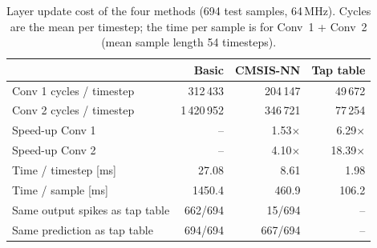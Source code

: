 \begin{table}[htbp]
\centering
\caption{Layer update cost of the four methods (694 test samples, 64\,MHz). Cycles are
the mean per timestep; the time per sample is for Conv~1 + Conv~2 (mean sample length 54 timesteps).}
\label{tab:method_comparison}
\begin{tabular}{lrrr}
\toprule
 & Basic & CMSIS-NN & Tap table \\
\midrule
Conv 1 cycles / timestep & 312\,433 & 204\,147 & 49\,672 \\
Conv 2 cycles / timestep & 1\,420\,952 & 346\,721 & 77\,254 \\
Speed-up Conv 1 & -- & 1.53$\times$ & 6.29$\times$ \\
Speed-up Conv 2 & -- & 4.10$\times$ & 18.39$\times$ \\
Time / timestep [ms] & 27.08 & 8.61 & 1.98 \\
Time / sample [ms] & 1450.4 & 460.9 & 106.2 \\
\midrule
Same output spikes as tap table & 662/694 & 15/694 & -- \\
Same prediction as tap table & 694/694 & 667/694 & -- \\
\bottomrule
\end{tabular}
\end{table}
